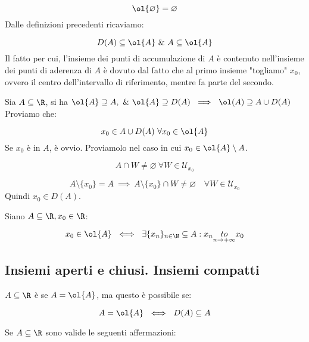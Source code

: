 \documentclass[../appunti.tex]{subfiles}
\begin{document}
\begin{equation} 
	\ol{\varnothing} = \varnothing
\end{equation}
Dalle definizioni precedenti ricaviamo:


\begin{equation}
	D(A) \subseteq \ol{A}\ \&\ A \subseteq \ol{A}
\end{equation}
Il fatto per cui, l'insieme dei punti di accumulazione di $A$ è contenuto
nell'insieme dei punti di aderenza di $A$ è dovuto dal fatto che al primo insieme
"togliamo" $x_0$, ovvero il centro dell'intervallo di riferimento, mentre
fa parte del secondo.


\begin{defn}[ $ \ol{A} = A \cup D(A) $ ]
Sia $\acr$, si ha $\ol{A} \supseteq A,\ \&\ \ol{A} \supseteq D(A) 
\ \implies\ \ol(A) \supseteq A \cup D(A)$\\
Proviamo che:


\begin{equation}
	x_0 \in A \cup D(A)\ \forall x_0 \in \ol{A}
\end{equation}
Se $x_0$ è in $A$, è ovvio. Proviamolo nel caso in cui $x_0 \in \ol{A} \setminus A$.


\begin{equation}
	A \cap W \neq \varnothing\ \forall W \in \mathcal{U}_{x_0}
\end{equation}
\bda


\begin{equation} 
	A \setminus \{ x_0 \} = A\ \implies\ A \setminus \{ x_0 \} \cap W
	\neq \varnothing \quad \forall W \in \mathcal{U}_{x_0}
\end{equation}
Quindi $x_0 \in D(A)$.
\end{defn}


\begin{defn}
Siano $ \acr , x_0 \in \R$:

\begin{equation}
	x_0 \in \ol{A}\ \iff\ \exists \{ x_n \}_{n \in \N} \subseteq
	A : x_n \underset{\nti}{to} x_0
\end{equation}
\end{defn}


\subsection{Insiemi aperti e chiusi. Insiemi compatti}

\begin{defn}
$\acr$ è  se $A = \ol{A}$, ma questo è possibile se:


\begin{equation}
	A = \ol{A}\ \iff\ D(A) \subseteq A
\end{equation}
\end{defn}
Se $\acr$ sono valide le seguenti affermazioni:
\end{document}
